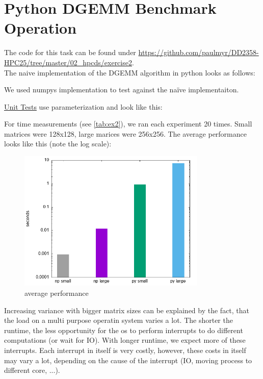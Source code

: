 \documentclass[a4paper,12pt]{article}
\begin{document}
\section{Python DGEMM Benchmark Operation}
The code for this task can be found under
\url{https://github.com/paulmyr/DD2358-HPC25/tree/master/02_hpcds/exercise2}.\\
The naive implementation of the DGEMM algorithm in python looks as follows:

We used numpys implementation to test against the naïve implementaiton.

\href{https://github.com/paulmyr/DD2358-HPC25/tree/master/02_hpcds/exercise2/test_exercise2.py}{Unit Tests} use parameterization and look like this:

For time measurements (see \ref{tab:ex2}), we ran each experiment 20 times.
Small matrices were 128x128, large marices were 256x256.
The average performance looks like this (note the log scale):
\begin{figure}[H]
  \centering
  \includegraphics[width=0.8\textwidth]{exercise2/graph.png}
  \caption{average performance}
\end{figure}
Increasing variance with bigger matrix sizes can be explained by the fact, that the load on a multi purpose operatin system varies a lot.
The shorter the runtime, the less opportunity for the os to perform interrupts to do different computations (or wait for IO).
With longer runtime, we expect more of these interrupts.
Each interrupt in itself is very costly, however, these costs in itself may vary a lot, depending on the cause of the interrupt (IO, moving process to different core, ...).
\end{document}
